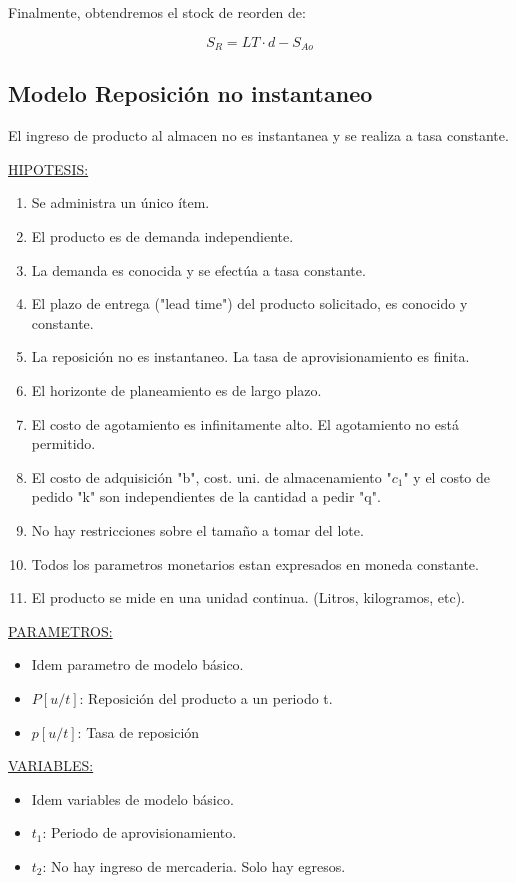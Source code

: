 \documentclass{article}
\begin{document}
Finalmente, obtendremos el stock de reorden de:

\begin{equation}
    S_R = LT \cdot d - S_{Ao}
\end{equation}


\newpage
\subsection{Modelo Reposición no instantaneo}

El ingreso de producto al almacen no es instantanea y se realiza a tasa constante.


\noindent
\underline{HIPOTESIS:}
\begin{enumerate}
    \item Se administra un único ítem.
    \item El producto es de demanda independiente.
    \item La demanda es conocida y se efectúa a tasa constante.
    \item El plazo de entrega ("lead time") del producto solicitado, es conocido y constante.
    \item La reposición no es instantaneo. La tasa de aprovisionamiento es finita.
    \item El horizonte de planeamiento es de largo plazo.
    \item El costo de agotamiento es infinitamente alto. El agotamiento no está permitido.
    \item El costo de adquisición "b", cost. uni. de almacenamiento "\(c_1\)" y el costo de pedido "k" son independientes de la cantidad a pedir "q".
    \item No hay restricciones sobre el tamaño a tomar del lote.
    \item Todos los parametros monetarios estan expresados en moneda constante.
    \item El producto se mide en una unidad continua. (Litros, kilogramos, etc).
\end{enumerate}


\noindent
\underline{PARAMETROS:}
\begin{itemize}
    \item Idem parametro de modelo básico.
    \item \(P[u/t]\): Reposición del producto a un periodo t. 
    \item \(p[u/t]\): Tasa de reposición
\end{itemize}

\noindent
\underline{VARIABLES:}
\begin{itemize}
    \item Idem variables de modelo básico.
    \item \(t_1\): Periodo de aprovisionamiento.
    \item \(t_2\): No hay ingreso de mercaderia. Solo hay egresos.
\end{itemize}
\end{document}
